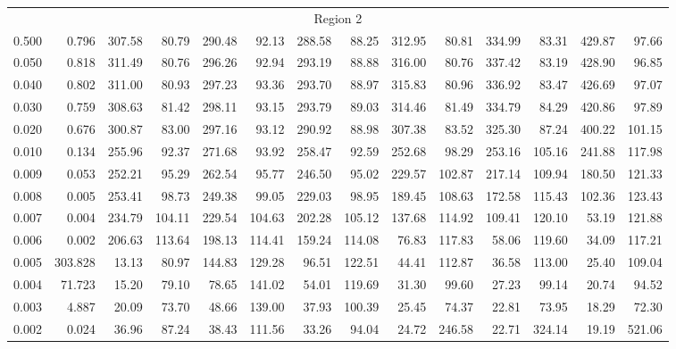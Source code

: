 \begin{tabular}{@{}lrrrrrrrrrrrrr@{}}
\midrule
\multicolumn{14}{c}{Region 2} \\
\cmidrule{1-14}
0.500 & 0.796 & 307.58 & 80.79 & 290.48 & 92.13 & 288.58 & 88.25 & 312.95 & 80.81 & 334.99 & 83.31 & 429.87 & 97.66 \\
0.050 & 0.818 & 311.49 & 80.76 & 296.26 & 92.94 & 293.19 & 88.88 & 316.00 & 80.76 & 337.42 & 83.19 & 428.90 & 96.85 \\
0.040 & 0.802 & 311.00 & 80.93 & 297.23 & 93.36 & 293.70 & 88.97 & 315.83 & 80.96 & 336.92 & 83.47 & 426.69 & 97.07 \\
0.030 & 0.759 & 308.63 & 81.42 & 298.11 & 93.15 & 293.79 & 89.03 & 314.46 & 81.49 & 334.79 & 84.29 & 420.86 & 97.89 \\
0.020 & 0.676 & 300.87 & 83.00 & 297.16 & 93.12 & 290.92 & 88.98 & 307.38 & 83.52 & 325.30 & 87.24 & 400.22 & 101.15 \\
0.010 & 0.134 & 255.96 & 92.37 & 271.68 & 93.92 & 258.47 & 92.59 & 252.68 & 98.29 & 253.16 & 105.16 & 241.88 & 117.98 \\
0.009 & 0.053 & 252.21 & 95.29 & 262.54 & 95.77 & 246.50 & 95.02 & 229.57 & 102.87 & 217.14 & 109.94 & 180.50 & 121.33 \\
0.008 & 0.005 & 253.41 & 98.73 & 249.38 & 99.05 & 229.03 & 98.95 & 189.45 & 108.63 & 172.58 & 115.43 & 102.36 & 123.43 \\
0.007 & 0.004 & 234.79 & 104.11 & 229.54 & 104.63 & 202.28 & 105.12 & 137.68 & 114.92 & 109.41 & 120.10 & 53.19 & 121.88 \\
0.006 & 0.002 & 206.63 & 113.64 & 198.13 & 114.41 & 159.24 & 114.08 & 76.83 & 117.83 & 58.06 & 119.60 & 34.09 & 117.21 \\
0.005 & 303.828 & 13.13 & 80.97 & 144.83 & 129.28 & 96.51 & 122.51 & 44.41 & 112.87 & 36.58 & 113.00 & 25.40 & 109.04 \\
0.004 & 71.723 & 15.20 & 79.10 & 78.65 & 141.02 & 54.01 & 119.69 & 31.30 & 99.60 & 27.23 & 99.14 & 20.74 & 94.52 \\
0.003 & 4.887 & 20.09 & 73.70 & 48.66 & 139.00 & 37.93 & 100.39 & 25.45 & 74.37 & 22.81 & 73.95 & 18.29 & 72.30 \\
0.002 & 0.024 & 36.96 & 87.24 & 38.43 & 111.56 & 33.26 & 94.04 & 24.72 & 246.58 & 22.71 & 324.14 & 19.19 & 521.06 \\


\end{tabular}
